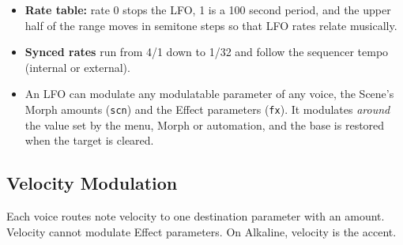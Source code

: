 \begin{itemize}
\tightlist
\item
  \textbf{Rate table:} rate 0 stops the LFO, 1 is a 100 second period,
  and the upper half of the range moves in semitone steps so that LFO
  rates relate musically.
\item
  \textbf{Synced rates} run from 4/1 down to 1/32 and follow the
  sequencer tempo (internal or external).
\item
  An LFO can modulate any modulatable parameter of any voice, the
  Scene's Morph amounts (\texttt{scn}) and the Effect parameters
  (\texttt{fx}). It modulates \emph{around} the value set by the menu,
  Morph or automation, and the base is restored when the target is
  cleared.
\end{itemize}

\subsection{Velocity Modulation}\label{velocity-modulation}

Each voice routes note velocity to one destination parameter with an
amount. Velocity cannot modulate Effect parameters. On Alkaline,
velocity is the accent.
